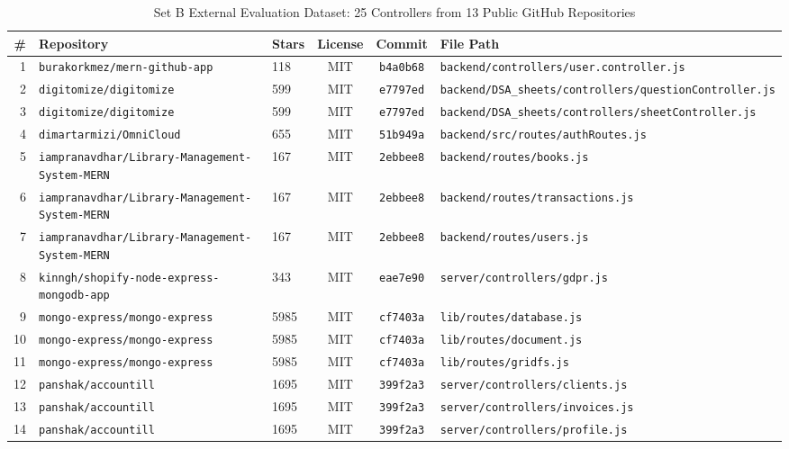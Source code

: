 \begin{table}[htbp]
\centering
\caption{Set B External Evaluation Dataset: 25 Controllers from 13 Public GitHub Repositories}
\label{tab:external_manifest}
\begin{tabular}{rllccl}
\toprule
\textbf{\#} & \textbf{Repository} & \textbf{Stars} & \textbf{License} & \textbf{Commit} & \textbf{File Path} \\
\midrule
1 & \texttt{burakorkmez/mern-github-app} & 118 & MIT & \texttt{b4a0b68} & \texttt{backend/controllers/user.controller.js} \\
2 & \texttt{digitomize/digitomize} & 599 & MIT & \texttt{e7797ed} & \texttt{backend/DSA\_sheets/controllers/questionController.js} \\
3 & \texttt{digitomize/digitomize} & 599 & MIT & \texttt{e7797ed} & \texttt{backend/DSA\_sheets/controllers/sheetController.js} \\
4 & \texttt{dimartarmizi/OmniCloud} & 655 & MIT & \texttt{51b949a} & \texttt{backend/src/routes/authRoutes.js} \\
5 & \texttt{iampranavdhar/Library-Management-System-MERN} & 167 & MIT & \texttt{2ebbee8} & \texttt{backend/routes/books.js} \\
6 & \texttt{iampranavdhar/Library-Management-System-MERN} & 167 & MIT & \texttt{2ebbee8} & \texttt{backend/routes/transactions.js} \\
7 & \texttt{iampranavdhar/Library-Management-System-MERN} & 167 & MIT & \texttt{2ebbee8} & \texttt{backend/routes/users.js} \\
8 & \texttt{kinngh/shopify-node-express-mongodb-app} & 343 & MIT & \texttt{eae7e90} & \texttt{server/controllers/gdpr.js} \\
9 & \texttt{mongo-express/mongo-express} & 5985 & MIT & \texttt{cf7403a} & \texttt{lib/routes/database.js} \\
10 & \texttt{mongo-express/mongo-express} & 5985 & MIT & \texttt{cf7403a} & \texttt{lib/routes/document.js} \\
11 & \texttt{mongo-express/mongo-express} & 5985 & MIT & \texttt{cf7403a} & \texttt{lib/routes/gridfs.js} \\
12 & \texttt{panshak/accountill} & 1695 & MIT & \texttt{399f2a3} & \texttt{server/controllers/clients.js} \\
13 & \texttt{panshak/accountill} & 1695 & MIT & \texttt{399f2a3} & \texttt{server/controllers/invoices.js} \\
14 & \texttt{panshak/accountill} & 1695 & MIT & \texttt{399f2a3} & \texttt{server/controllers/profile.js} \\

\end{tabular}
\end{table}
